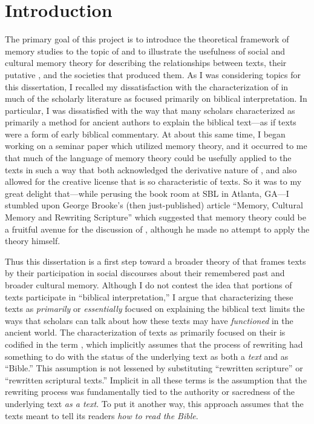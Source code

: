 
\chapter*{Introduction}


The primary goal of this project is to introduce the theoretical framework of memory studies to the topic of \rwb and to illustrate the usefulness of social and cultural memory theory for describing the relationships between \rwb texts, their putative \vorlagen, and the societies that produced them. As I was considering topics for this dissertation, I recalled my dissatisfaction with the characterization of \rwb in much of the scholarly literature as focused primarily on biblical interpretation. In particular, I was dissatisfied with the way that many scholars characterized \rwb as primarily a method for ancient authors to explain the biblical text---as if \rwb texts were a form of early biblical commentary. At about this same time, I began working on a seminar paper which utilized memory theory, and it occurred to me that much of the language of memory theory could be usefully applied to the \rwb texts in such a way that both acknowledged the derivative nature of \rwb, and also allowed for the creative license that is so characteristic of \rwb texts. So it was to my great delight that---while perusing the book room at SBL in Atlanta, GA---I stumbled upon George Brooke's (then just-published) article ``Memory, Cultural Memory and Rewriting Scripture'' which suggested that memory theory could be a fruitful avenue for the discussion of \rwb, although he made no attempt to apply the theory himself.%
    \autocite{brooke_zsengeller2014}

Thus this dissertation is a first step toward a broader theory of \rwb that frames \rwb texts by their participation in social discourses about their remembered past and broader cultural memory. Although I do not contest the idea that portions of \rwb texts participate in ``biblical interpretation,'' I argue that characterizing these texts as \emph{primarily} or \emph{essentially} focused on explaining the biblical text limits the ways that scholars can talk about how these texts may have \emph{functioned} in the ancient world. The characterization of \rwb texts as primarily focused on their \vorlagen is codified in the term \rwb, which implicitly assumes that the process of rewriting had something to do with the status of the underlying text as both a \emph{text} and as ``Bible.'' This assumption is not lessened by substituting ``rewritten scripture'' or ``rewritten scriptural texts.'' Implicit in all these terms is the assumption that the rewriting process was fundamentally tied to the authority or sacredness of the underlying text \emph{as a text}. To put it another way, this approach assumes that the \rwb texts meant to tell its readers \emph{how to read the Bible}.

